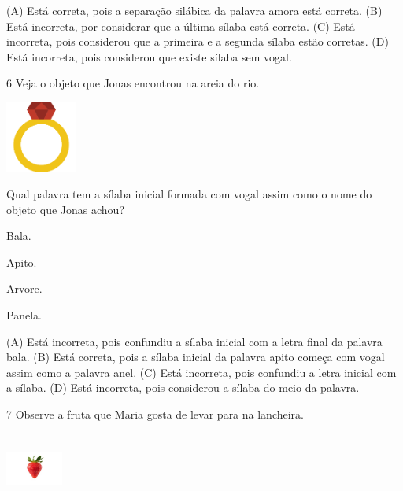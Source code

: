 (A) Está correta, pois a separação silábica da palavra amora está correta.
(B) Está incorreta, por considerar que a última sílaba está correta.
(C) Está incorreta, pois considerou que a primeira e a segunda sílaba estão corretas.
(D) Está incorreta, pois considerou que existe sílaba sem vogal.

\num{6} Veja o objeto que Jonas encontrou na areia do rio.

\includegraphics[width=0.92222in,height=0.92222in]{media/image151.png}


Qual palavra tem a sílaba inicial formada com vogal assim como o nome do objeto que Jonas achou?

\begin{minipage}{.5\textwidth}
\begin{escolha}
\item Bala.

\item Apito.

\item Arvore.

\item Panela.
\end{escolha}
\end{minipage}

(A) Está incorreta, pois confundiu a sílaba inicial com a letra final da palavra bala.
(B) Está correta, pois a sílaba inicial da palavra apito começa com
vogal assim como a palavra anel.
(C) Está incorreta, pois confundiu a letra inicial com a sílaba.
(D) Está incorreta, pois considerou a sílaba do meio da palavra.

\num{7} Observe a fruta que Maria gosta de levar para na lancheira.

\includegraphics[width=0.73819in,height=0.93750in]{media/image152.jpeg}

